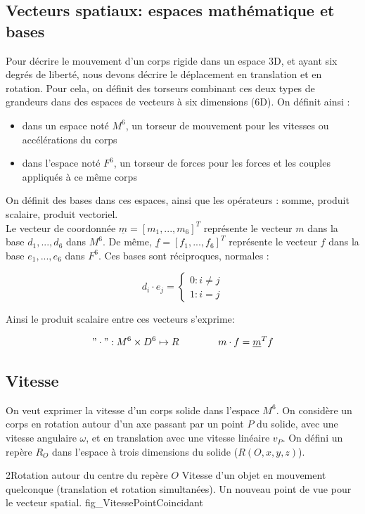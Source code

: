 \documentclass{report}
\begin{document}
\subsection{Vecteurs spatiaux: espaces mathématique et bases}

Pour décrire le mouvement d'un corps rigide dans un espace 3D, et ayant six degrés de liberté, nous devons décrire le déplacement en translation et en rotation. Pour cela, on définit des torseurs combinant ces deux types de grandeurs dans des espaces de vecteurs à six dimensions (6D). On définit ainsi :\\
\begin{itemize}
\item dans un espace noté $M^{6}$, un torseur de mouvement pour les vitesses ou accélérations du corps
\item dans l'espace noté $F^{6}$, un torseur de forces pour les forces et les couples appliqués à ce même corps
\end{itemize}
On définit des bases dans ces espaces, ainsi que les opérateurs : somme, produit scalaire, produit vectoriel.\\
Le vecteur de coordonnée $\underline{m}=[m_{1},...,m_{6}]^T$ représente le vecteur $m$ dans la base ${d_{1},...,d_{6}}$ dans $M^{6}$.
De même, $\underline{f}=[f_{1},...,f_{6}]^T$ représente le vecteur $f$ dans la base ${e_{1},...,e_{6}}$ dans $F^{6}$.
Ces bases sont réciproques, normales :

$$
d_{i}\cdot e_{j}=
\begin{cases}
0 \colon i \neq j\\
1 \colon i = j
\end{cases}
$$

Ainsi le produit scalaire entre ces vecteurs s'exprime:

$$
"\cdot" : M^{6} \times D^{6} \mapsto R
\qquad
\qquad
m \cdot f = \underline{m}^T f
$$

\subsection{Vitesse}\label{ch_algSpa_Vitesse}

On veut exprimer la vitesse d'un corps solide dans l'espace $M^{6}$. On considère un corps en rotation autour d'un axe passant par un point $P$ du solide, avec une vitesse angulaire $\omega$, et en translation avec une vitesse linéaire $v_{P}$. On défini un repère $R_{O}$ dans l'espace à trois dimensions du solide ($R(O,x,y,z)$).

{2}{Rotation autour du centre du repère $O$}
{Vitesse d'un objet en mouvement quelconque (translation et rotation simultanées). Un nouveau point de vue pour le vecteur spatial.}
{fig_VitessePointCoincidant}
\end{document}

